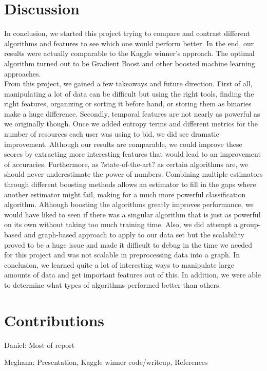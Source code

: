 \documentclass{article} %
\begin{document}
\section{Discussion}
In conclusion, we started this project trying to compare and contrast different algorithms and features to see which one would perform better. In the end, our results were actually comparable to the Kaggle winner's approach. The optimal algorithm turned out to be Gradient Boost and other boosted machine learning approaches. \\

From this project, we gained a few takeaways and future direction. First of all, manipulating a lot of data can be difficult but using the right tools, finding the right features, organizing or sorting it before hand, or storing them as binaries make a huge difference. Secondly, temporal features are not nearly as powerful as we originally though. Once we added entropy terms and different metrics for the number of resources each user was using to bid, we did see dramatic improvement. Although our results are comparable, we could improve these scores by extracting more interesting features that would lead to an improvement of accuracies. Furthermore, as ?state-of-the-art? as certain algorithms are, we should never underestimate the power of numbers. Combining multiple estimators through different boosting methods allows an estimator to fill in the gaps where another estimator might fail, making for a much more powerful classification algorithm. Although boosting the algorithms greatly improves performance, we would have liked to seen if there was a singular algorithm that is just as powerful on its own without taking too much training time. Also, we did attempt a group-based and graph-based approach to apply to our data set but the scalability proved to be a huge issue and made it difficult to debug in the time we needed for this project and was not scalable in preprocessing data into a graph. In conclusion, we learned quite a lot of interesting ways to manipulate large amounts of data and get important features out of this. In addition, we were able to determine what types of algorithms performed better than others.

\section{Contributions}

Daniel: Most of report

Meghana: Presentation, Kaggle winner code/writeup, References
\end{document}
